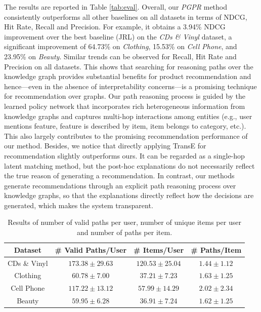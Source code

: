 \documentclass[sigconf]{acmart}
\begin{document}
The results are reported in Table \ref{tab:eval}.
Overall, our \emph{PGPR} method consistently outperforms all other baselines on all datasets in terms of NDCG, Hit Rate, Recall and Precision. For example, it obtains a 3.94\% NDCG improvement over the best baseline (JRL) on the \emph{CDs \& Vinyl} dataset, a significant improvement of 64.73\% on \emph{Clothing}, 15.53\% on \emph{Cell Phone}, and 23.95\% on \emph{Beauty}.
Similar trends can be observed for Recall, Hit Rate and Precision on all datasets. This shows that searching for reasoning paths over the knowledge graph provides substantial benefits for product recommendation and hence---even in the absence of interpretability concerns---is a promising technique for recommendation over graphs.
Our path reasoning process is guided by the learned policy network that incorporates rich heterogeneous information from knowledge graphs and captures multi-hop interactions among entities (e.g., user mentions feature, feature is described by item, item belongs to category, etc.).
This also largely contributes to the promising recommendation performance of our method.
Besides, we notice that directly applying TransE for recommendation \cite{ai2018learning} slightly outperforms ours. It can be regarded as a single-hop latent matching method, but the post-hoc explanations do not necessarily reflect the true reason of generating a recommendation. In contrast, our methods generate recommendations through an explicit path reasoning process over knowledge graphs, so that the explanations directly reflect how the decisions are generated, which makes the system transparent.

\begin{table}[t]
	\small
	\centering
	\begin{tabular}{c|ccc}
		\hline
		Dataset & \# Valid Paths/User & \# Items/User & \# Paths/Item \\
		\hline
		CDs \& Vinyl & $173.38\pm 29.63$ & $120.53\pm 25.04$ & $1.44\pm 1.12$ \\
		Clothing & $60.78\pm 7.00$ & $37.21\pm 7.23$ & $1.63\pm 1.25$ \\
		Cell Phone & $117.22\pm13.12$ & $57.99\pm 14.29$ & $2.02\pm 2.34$ \\
		Beauty & $59.95\pm 6.28$ & $36.91\pm 7.24$ & $1.62\pm 1.25$ \\
		\hline
	\end{tabular}
	\caption{Results of number of valid paths per user, number of unique items per user and number of paths per item.}
	\label{tab:valid_path}
	\vspace{-25pt}
\end{table}
\end{document}
